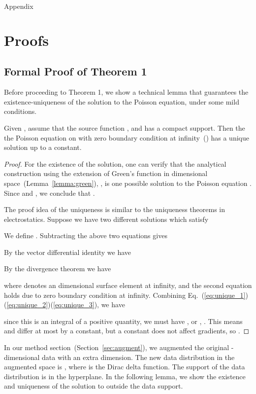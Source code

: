 \newpage

{\huge Appendix}


\def\E{{\bf E}}
\def\x{{\bf x}}
\def\r{{\bf r}}
\def\rhat{\hat{r}}

\section{Proofs}
\label{app:proofs}
\subsection{Formal Proof of Theorem 1}

Before proceeding to Theorem 1, we show a technical lemma that guarantees the existence-uniqueness of the solution to the Poisson equation, under some mild conditions. 
\begin{lemma}
\label{lemma:ex-uni}
{Given , assume that the source function , and  has a compact support. Then the the Poisson equation  on  with zero boundary condition at infinity~() has a unique solution  up to a constant.}
\end{lemma}

\begin{proof}

For the existence of the solution, one can verify that the analytical construction using the extension of Green's function in  dimensional space~(Lemma~\ref{lemma:green}), \ie , is one possible solution to the Poisson equation . Since  and , we conclude that .

The proof idea of the uniqueness is similar to the uniqueness theorems in electrostatics. Suppose we have two different solutions  which satisfy 

We define . Subtracting the above two equations gives

By the  vector differential identity we have

By the divergence theorem we have

where  denotes an  dimensional surface element at infinity, and the second equation holds due to zero boundary condition at infinity. Combining Eq.~(\ref{eq:unique_1})(\ref{eq:unique_2})(\ref{eq:unique_3}), we have

since this is an integral of a positive quantity, we must have , or , . This means  and  differ at most by a constant, but a constant does not affect gradients, so . \end{proof}


{In our method section~(Section~\ref{sec:augment}), we augmented the original -dimensional data with an extra dimension. The new data distribution in the augmented space is , where  is the Dirac delta function. The support of the data distribution is in the  hyperplane. In the following lemma, we show the existence and uniqueness of the solution to  outside the data support.}

